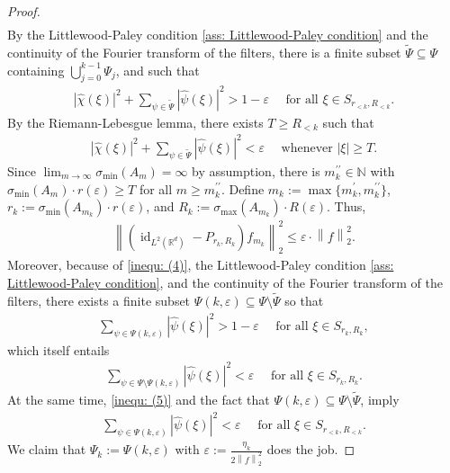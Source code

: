 \documentclass[11pt]{amsart}
\newcommand{\R}{{\mathbb{R}}}
\newcommand{\N}{\mathbb{N}}
\newcommand{\norm}[1]{\ensuremath{\left\lVert\text{}#1\text{}\right\rVert}}
\DeclareMathOperator{\id}{id}
\newenvironment{proof sketch} {\textit{Proof sketch.}}{}
\begin{document}
\begin{proof}
\begin{align*}
    \end{align*}
    By the Littlewood-Paley condition \eqref{ass: Littlewood-Paley condition} and the continuity of the Fourier transform of the filters, there is a finite subset $\widetilde{\Psi}\subseteq \Psi$ containing $\bigcup_{j=0}^{k-1}\Psi_j$, and such that
    \begin{align}\label{inequ: (5)}
      |\widehat{\chi}(\xi)|^2+\sum_{\psi \in \widetilde{\Psi}}|\widehat{\psi}(\xi)|^2 > 1-\varepsilon \quad \text{ for all } \xi \in S_{r_{<k},R_{<k}}.
    \end{align} 
    By the Riemann-Lebesgue lemma, there exists $T\geq R_{<k}$ such that
    \begin{align}\label{inequ: (4)}
      |\widehat{\chi}(\xi)|^2+\sum_{\psi \in \widetilde{\Psi}}|\widehat{\psi}(\xi)|^2 < \varepsilon \quad \text{ whenever } |\xi| \geq T.
    \end{align}
    Since $\lim_{m \to \infty}\sigma_{\text{min}}\left(A_{m}\right)=\infty$ by assumption, there is $m_k^{\prime\prime}\in \N$ with $\sigma_{\text{min}}(A_{m}) \cdot r(\varepsilon)\geq T$ for all $m \geq m_k^{\prime\prime}$.
    Define $m_k:=\max\{m_k^\prime,m_k^{\prime\prime}\}$, $r_k:=\sigma_{\text{min}}(A_{m_k}) \cdot r(\varepsilon)$, and $R_k:=\sigma_{\text{max}}(A_{m_k}) \cdot R(\varepsilon)$. Thus,
    \begin{align*}
      \norm{(\id_{L^2(\R^d)}-P_{r_{k},R_{k}})f_{m_k}}_2^2 \leq \varepsilon \cdot \norm{f}_2^2.
    \end{align*}
    Moreover, because of \eqref{inequ: (4)}, the Littlewood-Paley condition \eqref{ass: Littlewood-Paley condition}, and the continuity of the Fourier transform of the filters, there exists a finite subset $\Psi(k,\varepsilon)\subseteq \Psi \setminus \widetilde{\Psi}$ so that
    \begin{align*}
      \sum_{\psi \in \Psi(k,\varepsilon)}|\widehat{\psi}(\xi)|^2 > 1-\varepsilon \quad \text{ for all } \xi \in S_{r_k,R_k},
    \end{align*}
    which itself entails
    \begin{align}\label{inequ: (7)}
      \sum_{\psi \in \Psi \setminus \Psi(k,\varepsilon)}|\widehat{\psi}(\xi)|^2 < \varepsilon \quad \text{ for all } \xi \in S_{r_k,R_k}.
    \end{align}
    At the same time, \eqref{inequ: (5)} and the fact that $\Psi(k,\varepsilon)\subseteq \Psi \setminus \widetilde{\Psi}$, imply
    \begin{align}\label{inequ: (6)}
      \sum_{\psi \in \Psi(k,\varepsilon)}|\widehat{\psi}(\xi)|^2 < \varepsilon \quad \text{ for all } \xi \in S_{r_{<k},R_{<k}}.
    \end{align}
    We claim that $\Psi_k:=\Psi(k,\varepsilon)$ with $\varepsilon:=\frac{\eta_k}{2\norm{f}_2^2}$ does the job. 
  

\end{proof}
\end{document}
